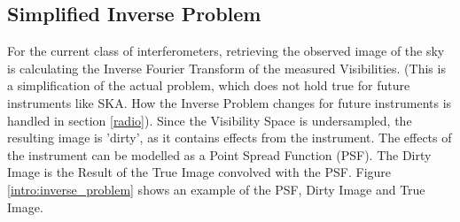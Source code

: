 \subsection{Simplified Inverse Problem}
For the current class of interferometers, retrieving the observed image of the sky is calculating the Inverse Fourier Transform of the measured Visibilities. (This is a simplification of the actual problem, which does not hold true for future instruments like SKA. How the Inverse Problem changes for future instruments is handled in section \ref{radio}). Since the Visibility Space is undersampled, the resulting image is 'dirty', as it contains effects from the instrument. The effects of the instrument can be modelled as a Point Spread Function (PSF). The Dirty Image is the Result of the True Image convolved with the PSF. Figure \ref{intro:inverse_problem} shows an example of the PSF, Dirty Image and True Image.
